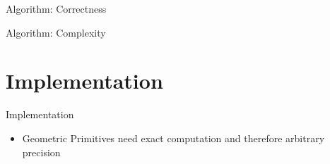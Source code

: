 \documentclass[aspectratio=169,fleqn]{beamer}
\begin{document}


  \begin{frame}{Algorithm: Correctness}
  \end{frame}

  \begin{frame}{Algorithm: Complexity}
  \end{frame}

\section{Implementation}
  \begin{frame}{Implementation}
    \begin{itemize}
      \item Geometric Primitives need exact computation and therefore arbitrary precision
    \end{itemize}
  \end{frame}
\end{document}
